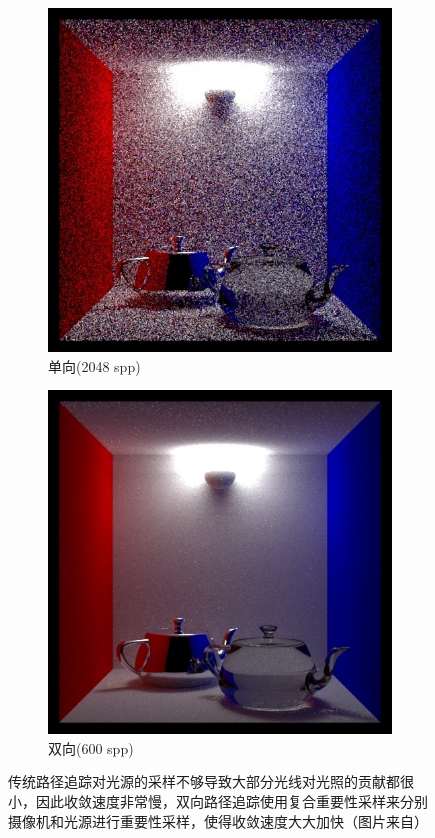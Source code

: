 \begin{figure}
\sidecaption
	{\begin{subfigure}[b]{0.31\textwidth}
		\includegraphics[width=1.0\textwidth]{figures/pt/path-8-1}
		\caption{单向(2048 spp)}
	\end{subfigure}
	\begin{subfigure}[b]{0.31\textwidth}
		\includegraphics[width=1.0\textwidth]{figures/pt/path-8-2}
		\caption{双向(600 spp)}
	\end{subfigure}
	}
	\caption{传统路径追踪对光源的采样不够导致大部分光线对光照的贡献都很小，因此收敛速度非常慢，双向路径追踪使用复合重要性采样来分别摄像机和光源进行重要性采样，使得收敛速度大大加快（图片来自\cite{a:PathtracinginRenderMan}）}
	\label{f:pt-bid-tracing-show}
\end{figure}

